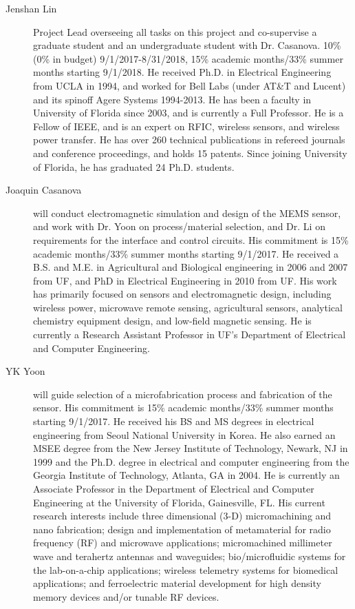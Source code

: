 \begin{description}
  \item[Jenshan Lin] Project Lead overseeing all tasks on this project and co-supervise a graduate student and an undergraduate student with Dr. Casanova. 10\% (0\% in budget) 9/1/2017-8/31/2018, 15\% academic months/33\% summer months starting 9/1/2018. He received Ph.D. in Electrical Engineering from UCLA in 1994, and worked for Bell Labs (under AT\&T and Lucent) and its spinoff Agere Systems 1994-2013. He has been a faculty in University of Florida since 2003, and is currently a Full Professor. He is a Fellow of IEEE, and is an expert on RFIC, wireless sensors, and wireless power transfer. He has over 260 technical publications in refereed journals and conference proceedings, and holds 15 patents. Since joining University of Florida, he has graduated 24 Ph.D. students.
  \item[Joaquin Casanova] will conduct electromagnetic simulation and design of the MEMS sensor, and work with Dr. Yoon on process/material selection, and Dr. Li on requirements for the interface and control circuits. His commitment is 15\% academic months/33\% summer months starting 9/1/2017. He received a B.S. and M.E. in Agricultural and Biological engineering in 2006 and 2007 from UF, and PhD in Electrical Engineering in 2010 from UF. His work has primarily focused on sensors and electromagnetic design, including wireless power, microwave remote sensing, agricultural sensors, analytical chemistry equipment design, and low-field magnetic sensing. He is currently a Research Assistant Professor in UF's Department of Electrical and Computer Engineering. 
  \item[YK Yoon] will guide selection of a microfabrication process and fabrication of the sensor. His commitment is 15\% academic months/33\% summer months starting 9/1/2017. He received his BS and MS degrees in electrical engineering from Seoul National University in Korea. He also earned an MSEE degree from the New Jersey Institute of Technology, Newark, NJ in 1999 and the Ph.D. degree in electrical and computer engineering from the Georgia Institute of Technology, Atlanta, GA in 2004. He is currently an Associate Professor in the Department of Electrical and Computer Engineering at the University of Florida, Gainesville, FL.  His current research interests include three dimensional (3-D) micromachining and nano fabrication; design and implementation of metamaterial for radio frequency (RF) and microwave applications; micromachined millimeter wave and terahertz antennas and waveguides; bio/microfluidic systems for the lab-on-a-chip applications; wireless telemetry systems for biomedical applications; and ferroelectric material development for high density memory devices and/or tunable RF devices.

\end{description}
